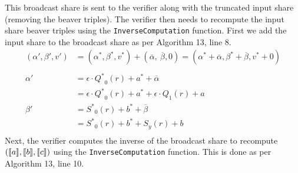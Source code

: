 \documentclass[twoside,11pt]{report}
\theoremstyle{definition}
\theoremstyle{plain}
\begin{document}
This broadcast share is sent to the verifier along with the truncated input share (removing the beaver triples). The verifier then needs to recompute the input share beaver triples using the \texttt{InverseComputation} function. First we add the input share to the broadcast share as per Algorithm 13, line 8.
\begin{align*}
  (\alpha', \beta', v') & = (\alpha^*, \beta^*, v^*) + (\overline{\alpha},\ \overline{\beta}, 0)
  = (\alpha^* + \overline{\alpha}, \beta^* + \overline{\beta}, v^* + 0)                          \\\\
  \alpha'               & = \epsilon \cdot {Q^*}_0(r) + a^* + \overline{\alpha}                  \\
                        & = \epsilon \cdot {Q^*}_0(r) + a^* + \epsilon \cdot Q_1(r) + a          \\
  \beta'                & = {S^*}_0(r) + b^* + \overline{\beta}                                  \\
                        & = {S^*}_0(r) + b^* + S_y(r) + b                                        \\
\end{align*}
Next, the verifier computes the inverse of the broadcast share to recompute $(\llbracket a \rrbracket, \llbracket b \rrbracket, \llbracket c \rrbracket)$ using the \texttt{InverseComputation} function. This is done as per Algorithm 13, line 10.
\end{document}
